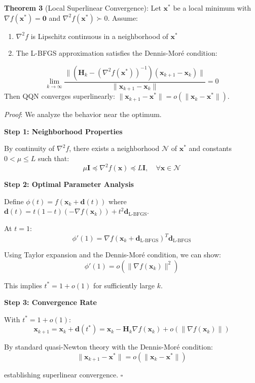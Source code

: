 \textbf{Theorem 3} (Local Superlinear Convergence): Let \(\mathbf{x}^*\) be a local minimum with \(\nabla f(\mathbf{x}^*) = \mathbf{0}\) and \(\nabla^2 f(\mathbf{x}^*) \succ 0\). Assume:

\begin{enumerate}
\def\labelenumi{\arabic{enumi}.}
\tightlist
\item
  \(\nabla^2 f\) is Lipschitz continuous in a neighborhood of \(\mathbf{x}^*\)
\item
  The L-BFGS approximation satisfies the Dennis-Moré condition:
\end{enumerate}

\[\lim_{k \to \infty} \frac{\|(\mathbf{H}_k - (\nabla^2 f(\mathbf{x}^*))^{-1})(\mathbf{x}_{k+1} - \mathbf{x}_k)\|}{\|\mathbf{x}_{k+1} - \mathbf{x}_k\|} = 0\]
Then QQN converges superlinearly: \(\|\mathbf{x}_{k+1} - \mathbf{x}^*\| = o(\|\mathbf{x}_k - \mathbf{x}^*\|)\).

\emph{Proof}: We analyze the behavior near the optimum.

\textbf{Step 1: Neighborhood Properties}

By continuity of \(\nabla^2 f\), there exists a neighborhood \(\mathcal{N}\) of \(\mathbf{x}^*\) and constants \(0 < \mu \leq L\) such that:
\[\mu \mathbf{I} \preceq \nabla^2 f(\mathbf{x}) \preceq L \mathbf{I}, \quad \forall \mathbf{x} \in \mathcal{N}\]

\textbf{Step 2: Optimal Parameter Analysis}

Define \(\phi(t) = f(\mathbf{x}_k + \mathbf{d}(t))\) where \(\mathbf{d}(t) = t(1-t)(-\nabla f(\mathbf{x}_k)) + t^2\mathbf{d}_{\text{L-BFGS}}\).

At \(t = 1\):
\[\phi'(1) = \nabla f(\mathbf{x}_k + \mathbf{d}_{\text{L-BFGS}})^T \mathbf{d}_{\text{L-BFGS}}\]

Using Taylor expansion and the Dennis-Moré condition, we can show:
\[\phi'(1) = o(\|\nabla f(\mathbf{x}_k)\|^2)\]

This implies \(t^* = 1 + o(1)\) for sufficiently large \(k\).

\textbf{Step 3: Convergence Rate}

With \(t^* = 1 + o(1)\):
\[\mathbf{x}_{k+1} = \mathbf{x}_k + \mathbf{d}(t^*) = \mathbf{x}_k - \mathbf{H}_k\nabla f(\mathbf{x}_k) + o(\|\nabla f(\mathbf{x}_k)\|)\]

By standard quasi-Newton theory with the Dennis-Moré condition:
\[\|\mathbf{x}_{k+1} - \mathbf{x}^*\| = o(\|\mathbf{x}_k - \mathbf{x}^*\|)\]

establishing superlinear convergence. \(\square\)

